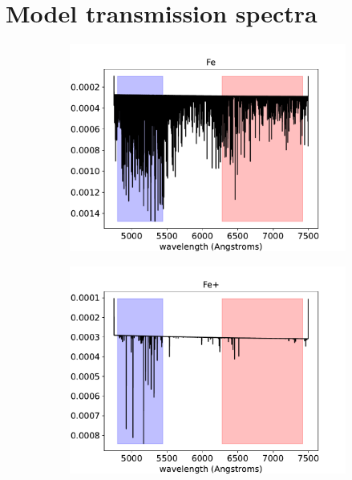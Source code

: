 \documentclass[twocolumn]{aastex631}
\begin{document}
    \section{Model transmission spectra}
        \begin{figure}[ht!]
            \centering
            \begin{subfigure}[b]{0.3\textwidth}
                \centering
                \includegraphics[width=\textwidth]{plots/spectra/spectrum.KELT-20b.Fe.5.39e-05.inverted-transmission-better}
                \label{fig:Fe-spectrum}
            \end{subfigure}
            \begin{subfigure}[b]{0.3\textwidth}
                \centering
                \includegraphics[width=\textwidth]{plots/spectra/spectrum.KELT-20b.Fe+.5.39e-05.inverted-transmission-better.pdf}

\end{subfigure}
\end{figure}
\end{document}
